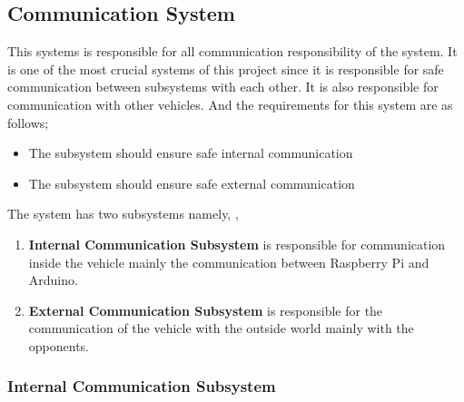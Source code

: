 \documentclass[a4paper,12pt]{article}
\begin{document}


\subsection{Communication System}


This systems is responsible for all communication responsibility of the system. It is one of the most crucial systems of this project since it is responsible for safe communication between subsystems with each other. It is also responsible for communication with other vehicles.	And the requirements for this system are as follows;		


\begin{itemize}

\item The subsystem should ensure safe internal communication

\item The subsystem should ensure safe external communication

\end{itemize}	



The system has two subsystems namely, 	,


\begin{enumerate}

\item \textbf{Internal Communication Subsystem} is responsible for communication inside the vehicle mainly the communication between Raspberry Pi and Arduino.						

\item \textbf{External Communication Subsystem} is responsible for the communication of the vehicle with the outside world mainly with the opponents.

\end{enumerate}		



\subsubsection{Internal Communication Subsystem}
\end{document}
